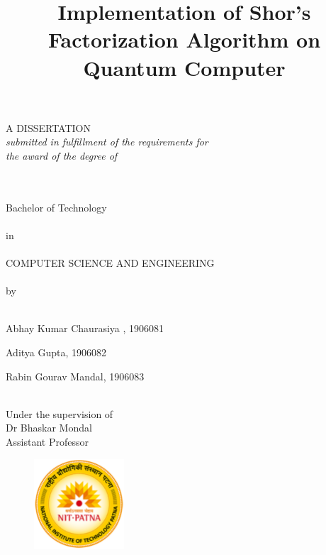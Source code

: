 \documentclass{article}
\title{\huge Implementation of Shor’s Factorization Algorithm on Quantum Computer}
\author{}
\date{\vspace{-5ex}}
\begin{document}
\maketitle

\begin{center}
    A DISSERTATION \\
    \textit{submitted in fulfillment of the requirements for} \\
    \textit{the award of the degree of}

    \text{\vspace{10ex}} \\
    \text{\vspace{10ex}} \\
    Bachelor of Technology \\
    \text{\vspace{4ex}} \\
    in \\
    \text{\vspace{4ex}} \\
    COMPUTER SCIENCE AND ENGINEERING \\
    \text{\vspace{4ex}} \\
    by \\

    \text{\vspace{4ex}} \\
    \item Abhay Kumar Chaurasiya , 1906081
    \item Aditya Gupta, 1906082
    \item Rabin Gourav Mandal, 1906083

    \text{\vspace{10ex}} \\
    Under the supervision of \\
    Dr Bhaskar Mondal \\
    Assistant Professor \\
\end{center}

\begin{figure}[!htb]
    \centering
    \includegraphics[width=0.3\textwidth]{images/nitp.png}
\end{figure}
\end{document}
